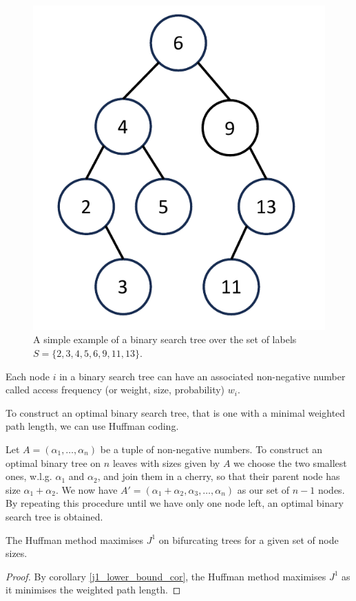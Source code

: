 \begin{figure}[h]
    \centering
    \includegraphics[width=.5\textwidth]{Chapter_2/figures/example_bst.pdf}
    \caption{A simple example of a binary search tree over the set of labels $S
    = \{2,3,4,5,6,9,11,13\}.$}
    \label{example_bst}
\end{figure}

\begin{remark}
    Each node $i$ in a binary search tree can have an associated non-negative
    number called access frequency (or weight, size, probability) $w_i$.
\end{remark}

To construct an optimal binary search tree, that is one with a minimal weighted
path length, we can use Huffman coding.

\begin{definition}
    Let $A = (\alpha_1, \dots, \alpha_n)$ be a tuple of non-negative numbers.
    To construct an optimal binary tree on $n$ leaves with sizes given by $A$
    we choose the two smallest ones, w.l.g. $\alpha_1$ and $\alpha_2$, and
    join them in a cherry, so that their parent node has size $\alpha_1 + \alpha_2$.
    We now have $A' = (\alpha_1 + \alpha_2, \alpha_3, \dots, \alpha_n)$ as our
    set of $n-1$ nodes. By repeating this procedure until we have only one node
    left, an optimal binary search tree is obtained.
\end{definition}

\begin{proposition}
    The Huffman method maximises $J^1$ on bifurcating trees for a given set of node sizes.
\end{proposition}

\begin{proof}
    By corollary \ref{j1_lower_bound_cor}, the Huffman method maximises $J^1$
    as it minimises the weighted path length.
\end{proof}

